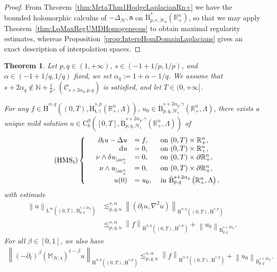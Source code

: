 \documentclass[10pt]{amsart}
\newtheorem{theo}{Theorem}[section]
\theoremstyle{definition}\newtheorem{defi}[theo]{Definition}\newtheorem{rema}[theo]{Remark}\newtheorem{exam}[theo]{Example}\newtheorem{exem}[theo]{Example}\newtheorem{nota}[theo]{Notation}
\newcommand{\bbR}{\mathbb{R}}
\newcommand{\bbN}{\mathbb{N}}
\newcommand{\bbM}{\mathbb{M}}
\newcommand{\rmH}{\mathrm{H}}%
\newcommand{\rmB}{\mathrm{B}}
\newcommand{\rmd}{\mathrm{d}}
\newcommand{\rmL}{\mathrm{L}}
\newcommand{\rmC}{\mathrm{C}}
\newcommand{\clH}{\mathcal{H}}
\newcommand{\clC}{\mathcal{C}}
\newcommand{\fkn}{\mathfrak{n}}
\newcommand{\fkt}{\mathfrak{t}}
\begin{document}
\begin{proof}
From Theorem~\ref{thm:MetaThm1HodgeLaplacianRn+} we have the bounded holomorphic calculus of $-\Delta_\clH,\fkn$ on $\dot{\rmB}^{s}_{p,r,\clH_{\fkn}}(\bbR^n_+)$, so that we may apply Theorem~\ref{thm:LqMaxRegUMDHomogeneous} to obtain maximal regularity estimates, whereas Proposition~\ref{prop:InterpHomDomainLaplacians} gives an exact description of interpolation spaces.
\end{proof}


\begin{theo}\label{thm:MaxRxHspUMDHodgeStokesRn+}
Let $p,q\in(1,+\infty)$, $s\in(-1+1/p,1/p)$, and $\alpha\in(-1+1/q,1/q)$ fixed, we set $\alpha_q:= 1+\alpha-1/q$. We assume that $s+2\alpha_q\notin \bbN +\frac{1}{p}$, $(\clC_{s+2\alpha_q,p,q})$ is satisfied, and let $T\in(0,+\infty]$.

For any $f\in \dot{\rmH}^{\alpha,q}((0,T),\dot{\rmH}^{s,p}_{\fkt,\gamma}(\bbR^n_+,\Lambda))$, $u_0\in \dot{\rmB}^{s+2\alpha_q,\gamma}_{p,q,\clH_\fkt}(\bbR^n_+,\Lambda)$, there exists a unique mild solution $u \in \rmC ^0_b([0,T],\dot{\rmB}^{s+2\alpha_q,\gamma}_{p,q,\clH_\fkt}(\bbR^n_+,\Lambda))$ of
\begin{equation}
\tag{HMS${}_{\fkt}$}\label{eq:HodgeMaxwellBCSystem}
\left\{
\begin{array}{rrll}
&{\partial_t u - \Delta u}  &{= f,} &{\text{ on } (0,T)\times\bbR^n_+,}\\
&{\rmd u} &{=  0,} &{\text{ on } (0,T)\times\bbR^n_+,}\\
&{\nu\wedge\delta u_{|_{\partial\bbR^n_+}}} &{= 0,} 
&{\text{ on } (0,T)\times\partial\bbR^n_+,}\\
&{\nu\wedge u_{|_{\partial\bbR^n_+}}} &{=  0,}
&{\text{ on } (0,T)\times\partial\bbR^n_+,}\\
&{u(0)} &{=  u_0,} &{\text{ in } \dot{\rmB}^{s+2\alpha_q}_{p,q}\left(\bbR^n_+,\Lambda\right),}
\end{array}\right.
\end{equation}
with estimate
\begin{align*}
\left\| u \right\|_{\rmL^\infty((0,T),\dot{\rmB}^{s+2\alpha_q}_{p,q})} &\lesssim_{p,q,n}^{s,\alpha} \left\| \left(\partial_t u, \nabla^2 u\right) \right\|_{\dot{\rmH}^{\alpha,q}\left((0,T),\dot{\rmH}^{s,p}\right)}\\&
\lesssim_{p,q,n}^{s,\alpha} \left\| f \right\|_{\dot{\rmH}^{\alpha,q}\left((0,T),\dot{\rmH}^{s,p}\right)} + \left\| u_0 \right\|_{\dot{\rmB}^{s+2\alpha_q}_{p,q}}.
\end{align*}
For all $\beta\in[0,1]$, we also have
\begin{align}\label{eq:fractionalEstimatePruss2}
\left\| \left(-\partial_t\right)^{\beta}\left(\bbM_\mathcal{H,\fkt}\right)^{1-\beta} u \right\|_{\dot{\rmH}^{\alpha,q}\left((0,T),\dot{\rmH}^{s,p}\right)} \lesssim_{p,q,n}^{s,\alpha} \left\| f \right\|_{\dot{\rmH}^{\alpha,q}\left((0,T),\dot{\rmH}^{s,p}\right)} + \left\| u_0 \right\|_{\dot{\rmB}^{s+2\alpha_q}_{p,q}}.
\end{align}
\end{theo}
\end{document}
